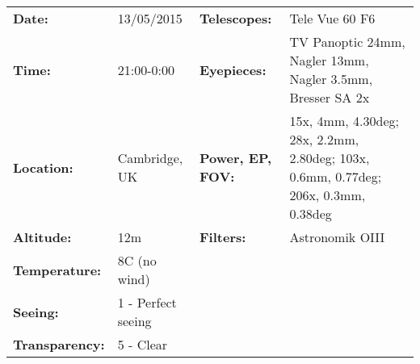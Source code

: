\begin{tabular}{ p{0.9in} p{1.3in} p{1.2in} p{5.2in}}
{\bf Date:} & 13/05/2015 & {\bf Telescopes:} & Tele Vue 60 F6 \\ 
{\bf Time:} & 21:00-0:00 & {\bf Eyepieces:} & TV Panoptic 24mm, Nagler 13mm, Nagler 3.5mm, Bresser SA 2x \\ 
{\bf Location:} & Cambridge, UK & {\bf Power, EP, FOV:} & 15x, 4mm, 4.30deg; 28x, 2.2mm, 2.80deg; 103x, 0.6mm, 0.77deg; 206x, 0.3mm, 0.38deg \\ 
{\bf Altitude:} & 12m & {\bf Filters:} & Astronomik OIII \\ 
{\bf Temperature:} & 8C (no wind) & & \\ 
{\bf Seeing:} & 1 - Perfect seeing & & \\ 
{\bf Transparency:} & 5 - Clear & & \\ 
\end{tabular}
